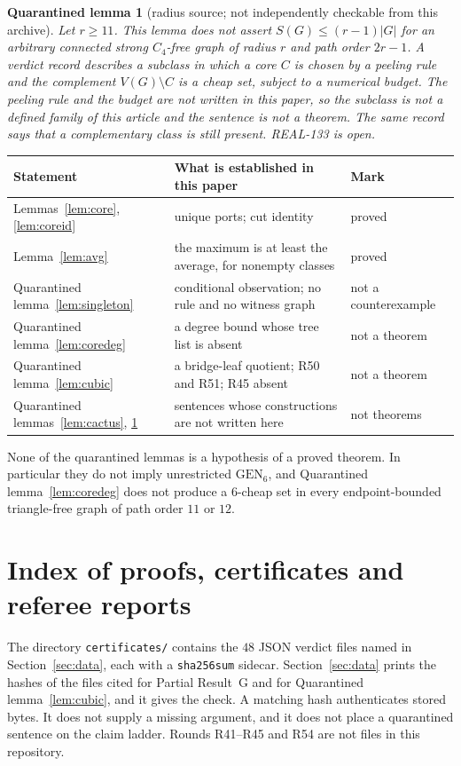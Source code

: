\documentclass[11pt]{amsart}
\newtheorem{qlemma}[theorem]{Quarantined lemma}
\theoremstyle{definition}
\theoremstyle{remark}
\newcommand{\GEN}{\mathrm{GEN}}
\begin{document}
\begin{qlemma}[radius source; not independently checkable from this archive]\label{lem:radsource}
Let $r\ge 11$. This lemma does not assert $S(G)\le(r-1)|G|$ for an arbitrary connected strong $C_4$-free graph of radius $r$ and path order $2r-1$. A verdict record describes a subclass in which a core $C$ is chosen by a peeling rule and the complement $V(G)\setminus C$ is a cheap set, subject to a numerical budget. The peeling rule and the budget are not written in this paper, so the subclass is not a defined family of this article and the sentence is not a theorem. The same record says that a complementary class is still present. REAL-133 is open.
\end{qlemma}

\begin{center}\small
\begin{tabular}{@{}p{3.4cm}p{6.2cm}p{4.6cm}@{}}
\toprule
Statement & What is established in this paper & Mark\\
\midrule
Lemmas~\ref{lem:core}, \ref{lem:coreid} & unique ports; cut identity & proved\\
Lemma~\ref{lem:avg} & the maximum is at least the average, for nonempty classes & proved\\
Quarantined lemma~\ref{lem:singleton} & conditional observation; no rule and no witness graph & not a counterexample\\
Quarantined lemma~\ref{lem:coredeg} & a degree bound whose tree list is absent & not a theorem\\
Quarantined lemma~\ref{lem:cubic} & a bridge-leaf quotient; R50 and R51; R45 absent & not a theorem\\
Quarantined lemmas~\ref{lem:cactus}, \ref{lem:radsource} & sentences whose constructions are not written here & not theorems\\
\bottomrule
\end{tabular}
\end{center}

None of the quarantined lemmas is a hypothesis of a proved theorem. In particular they do not imply unrestricted $\GEN_6$, and Quarantined lemma~\ref{lem:coredeg} does not produce a $6$-cheap set in every endpoint-bounded triangle-free graph of path order $11$ or $12$.

\section{Index of proofs, certificates and referee reports}\label{app:index}
The directory \nolinkurl{certificates/} contains the $48$ JSON verdict files named in Section~\ref{sec:data}, each with a \texttt{sha256sum} sidecar. Section~\ref{sec:data} prints the hashes of the files cited for Partial Result~G and for Quarantined lemma~\ref{lem:cubic}, and it gives the check. A matching hash authenticates stored bytes. It does not supply a missing argument, and it does not place a quarantined sentence on the claim ladder. Rounds R41--R45 and R54 are not files in this repository.
\end{document}
